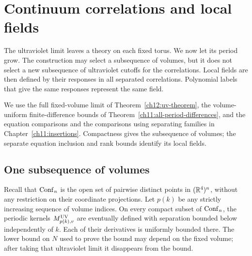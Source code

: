 \chapter{Continuum correlations and local fields}
\label{ch13:continuum}

The ultraviolet limit leaves a theory on each fixed torus.
We now let its period grow. The construction may select a subsequence
of volumes, but it does not select a new subsequence of ultraviolet
cutoffs for the correlations. Local fields are then defined by their
responses in all separated correlations. Polynomial labels that give
the same responses represent the same field.

We use the full fixed-volume limit of
Theorem~\ref{ch12:uv-theorem}, the volume-uniform finite-difference
bounds of Theorem~\ref{ch11:all-period-differences}, and the equation comparisons and the comparisons using separating families in Chapter~\ref{ch11:insertions}.
Compactness gives the subsequence of volumes; the separate equation
inclusion and rank bounds identify its local fields.

\section{One subsequence of volumes}
\label{ch13:extraction}

Recall that $\operatorname{Conf}_n$ is the open set of pairwise distinct points in
$(\mathbb R^4)^n$, without any restriction on their coordinate projections.
Let $p(k)$ be any strictly increasing sequence of volume indices.
On every compact subset of $\operatorname{Conf}_n$, the periodic kernels
$M^{\rm UV}_{p(k),v}$ are eventually defined with separation bounded
below independently of $k$. Each of their derivatives is uniformly
bounded there. The lower bound on $N$ used to prove the bound may
depend on the fixed volume; after taking that ultraviolet limit it
disappears from the bound.

